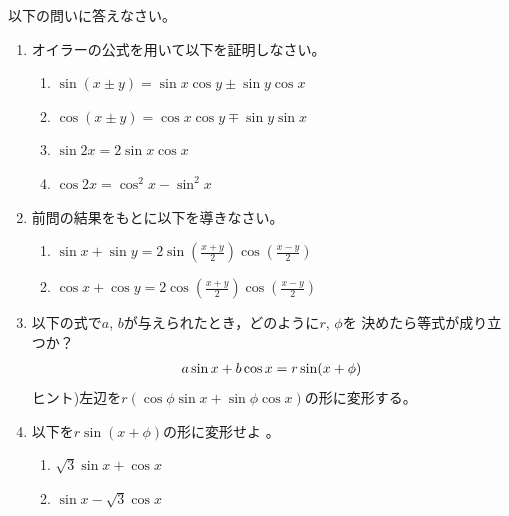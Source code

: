 \documentclass[twocolumn,11pt]{jarticle}
\begin{document}
\nquestion 以下の問いに答えなさい。
\begin{enumerate}
\item
オイラーの公式を用いて以下を証明しなさい。
\begin{enumerate}
\item $\sin(x\pm y)=\sin x\cos y\pm\sin y\cos x$
\item $\cos(x\pm y)=\cos x\cos y\mp\sin y\sin x$
\item $\displaystyle\sin 2x=2\sin x\cos x$
\item $\displaystyle\cos 2x=\cos^2x-\sin^2x$
\end{enumerate}
\item 前問の結果をもとに以下を導きなさい。
\begin{enumerate}
\item $\displaystyle\sin x+\sin y=2\sin(\frac{x+y}{2})\cos(\frac{x-y}{2})$
\item $\displaystyle\cos x+\cos y=2\cos(\frac{x+y}{2})\cos(\frac{x-y}{2})$
\end{enumerate}
\item 以下の式で$a$, $b$が与えられたとき，どのように$r$, $\phi$を
  決めたら等式が成り立つか？
  \begin{align}
    a\sin x+b\cos x=r\sin(x+\phi)\notag
  \end{align}
ヒント)左辺を$r(\cos\phi\sin x+\sin\phi\cos x)$の形に変形する。
\item 以下を$r\sin(x+\phi)$の形に変形せよ
。
  \begin{enumerate}
   \item\label{item:sqrt(3)sinx+cosx} $\sqrt{3}\sin x+\cos x$
   \item\label{item:sinx-sqrt(3)cosx} $\sin x-\sqrt{3}\cos x$
  \end{enumerate}
\end{enumerate}
\end{document}
